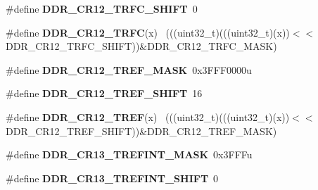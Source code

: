\begin{DoxyCompactItemize}
\item 
\hypertarget{group___d_d_r___register___masks_gad0b095c80bd038c1d9683029a9510972}{}\#define {\bfseries D\+D\+R\+\_\+\+C\+R12\+\_\+\+T\+R\+F\+C\+\_\+\+S\+H\+I\+F\+T}~0\label{group___d_d_r___register___masks_gad0b095c80bd038c1d9683029a9510972}

\item 
\hypertarget{group___d_d_r___register___masks_gad48bd3739246f71f6054d7612e882d46}{}\#define {\bfseries D\+D\+R\+\_\+\+C\+R12\+\_\+\+T\+R\+F\+C}(x)                                              ~(((uint32\+\_\+t)(((uint32\+\_\+t)(x))$<$$<$D\+D\+R\+\_\+\+C\+R12\+\_\+\+T\+R\+F\+C\+\_\+\+S\+H\+I\+F\+T))\&D\+D\+R\+\_\+\+C\+R12\+\_\+\+T\+R\+F\+C\+\_\+\+M\+A\+S\+K)\label{group___d_d_r___register___masks_gad48bd3739246f71f6054d7612e882d46}

\item 
\hypertarget{group___d_d_r___register___masks_gaa60628d79989a0fff0e946e3a2aa8dc5}{}\#define {\bfseries D\+D\+R\+\_\+\+C\+R12\+\_\+\+T\+R\+E\+F\+\_\+\+M\+A\+S\+K}~0x3\+F\+F\+F0000u\label{group___d_d_r___register___masks_gaa60628d79989a0fff0e946e3a2aa8dc5}

\item 
\hypertarget{group___d_d_r___register___masks_ga6f7d130b99f93ee6992377a38b25fb0b}{}\#define {\bfseries D\+D\+R\+\_\+\+C\+R12\+\_\+\+T\+R\+E\+F\+\_\+\+S\+H\+I\+F\+T}~16\label{group___d_d_r___register___masks_ga6f7d130b99f93ee6992377a38b25fb0b}

\item 
\hypertarget{group___d_d_r___register___masks_ga741467c7299998a6e81e69a7d184a4e6}{}\#define {\bfseries D\+D\+R\+\_\+\+C\+R12\+\_\+\+T\+R\+E\+F}(x)                                              ~(((uint32\+\_\+t)(((uint32\+\_\+t)(x))$<$$<$D\+D\+R\+\_\+\+C\+R12\+\_\+\+T\+R\+E\+F\+\_\+\+S\+H\+I\+F\+T))\&D\+D\+R\+\_\+\+C\+R12\+\_\+\+T\+R\+E\+F\+\_\+\+M\+A\+S\+K)\label{group___d_d_r___register___masks_ga741467c7299998a6e81e69a7d184a4e6}

\item 
\hypertarget{group___d_d_r___register___masks_ga1a0c6be095292b2378b9f77c5c9c6a8f}{}\#define {\bfseries D\+D\+R\+\_\+\+C\+R13\+\_\+\+T\+R\+E\+F\+I\+N\+T\+\_\+\+M\+A\+S\+K}~0x3\+F\+F\+Fu\label{group___d_d_r___register___masks_ga1a0c6be095292b2378b9f77c5c9c6a8f}

\item 
\hypertarget{group___d_d_r___register___masks_ga6da01a4adf69cc23d3f34ae028aab326}{}\#define {\bfseries D\+D\+R\+\_\+\+C\+R13\+\_\+\+T\+R\+E\+F\+I\+N\+T\+\_\+\+S\+H\+I\+F\+T}~0\label{group___d_d_r___register___masks_ga6da01a4adf69cc23d3f34ae028aab326}


\end{DoxyCompactItemize}
